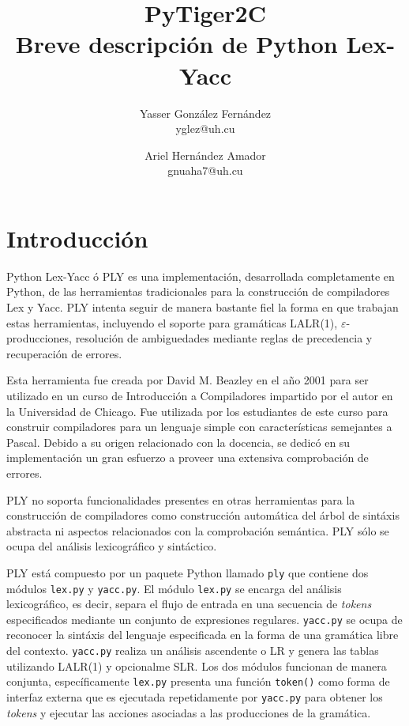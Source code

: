 \documentclass{article}
\title{
	\LARGE{PyTiger2C} \\
	\Large{Breve descripción de Python Lex-Yacc}
}
\author{
  	Yasser González Fernández \\
  	\small{yglez@uh.cu}
  	\and
  	Ariel Hernández Amador \\
  	\small{gnuaha7@uh.cu}
}
\date{}
\begin{document}
\maketitle

\thispagestyle{empty}

\newpage

\setcounter{page}{1}

\section{Introducción}

Python Lex-Yacc ó PLY es una implementación, desarrollada completamente en
Python, de las herramientas tradicionales para la construcción de compiladores
Lex y Yacc. PLY intenta seguir de manera bastante fiel la forma en que
trabajan estas herramientas, incluyendo el soporte para gramáticas LALR(1),
$\varepsilon$-producciones, resolución de ambiguedades mediante reglas de
precedencia y recuperación de errores.

Esta herramienta fue creada por David M. Beazley en el año 2001 para ser
utilizado en un curso de Introducción a Compiladores impartido por el autor en
la Universidad de Chicago. Fue utilizada por los estudiantes de este curso
para construir compiladores para un lenguaje simple con características
semejantes a Pascal. Debido a su origen relacionado con la docencia, se dedicó
en su implementación un gran esfuerzo a proveer una extensiva comprobación de
errores.

PLY no soporta funcionalidades presentes en otras herramientas para la
construcción de compiladores como construcción automática del árbol de sintáxis
abstracta ni aspectos relacionados con la comprobación semántica. PLY sólo se
ocupa del análisis lexicográfico y sintáctico.

PLY está compuesto por un paquete Python llamado \texttt{ply} que contiene
dos módulos \texttt{lex.py} y \texttt{yacc.py}. El módulo \texttt{lex.py} se
encarga del análisis lexicográfico, es decir, separa el flujo de entrada en una
secuencia de \textit{tokens} especificados mediante un conjunto de expresiones
regulares. \texttt{yacc.py} se ocupa de reconocer la sintáxis del lenguaje
especificada en la forma de una gramática libre del contexto. \texttt{yacc.py}
realiza un análisis ascendente o LR y genera las tablas utilizando LALR(1) y
opcionalme SLR. Los dos módulos funcionan de manera conjunta, específicamente
\texttt{lex.py} presenta una función \texttt{token()} como forma de interfaz
externa que es  ejecutada repetidamente por \texttt{yacc.py} para obtener los
\textit{tokens} y  ejecutar las acciones asociadas a las producciones de la
gramática. 
\end{document}
